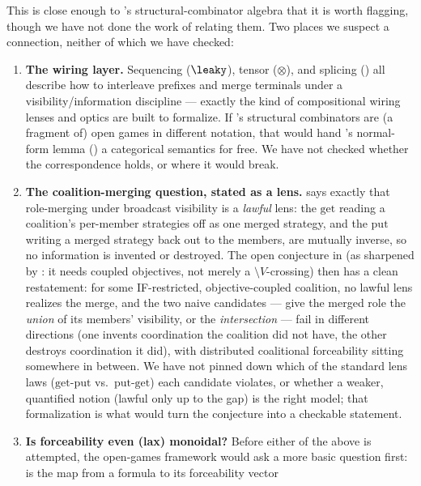 This is close enough to 's structural-combinator
algebra that it is worth flagging, though we have not done the work of
relating them. Two places we suspect a connection, neither of which we have
checked:
\begin{enumerate}[nosep]
  \item \textbf{The wiring layer.} Sequencing ($\leaky$), tensor ($\otimes$),
  and splicing () all describe how to interleave prefixes
  and merge terminals under a visibility/information discipline --- exactly
  the kind of compositional wiring lenses and optics are built to formalize.
  If \KFOL's structural combinators are (a fragment of) open games in
  different notation, that would hand 's
  normal-form lemma () a categorical
  semantics for free. We have not checked whether the correspondence holds,
  or where it would break.
  \item \textbf{The coalition-merging question, stated as a lens.}
   says exactly that role-merging under
  broadcast visibility is a \emph{lawful} lens: the $\mathrm{get}$ reading a
  coalition's per-member strategies off as one merged strategy, and the
  $\mathrm{put}$ writing a merged strategy back out to the members, are
  mutually inverse, so no information is invented or destroyed. The open
  conjecture in  (as sharpened by
  : it needs coupled objectives, not
  merely a $\setminus V$-crossing) then has a clean restatement: for some
  IF-restricted, objective-coupled coalition, no lawful lens realizes the
  merge, and the two naive candidates --- give the merged role the
  \emph{union} of its members' visibility, or the \emph{intersection} ---
  fail in different directions (one invents coordination the coalition did
  not have, the other destroys coordination it did), with distributed
  coalitional forceability sitting somewhere in between. We have not pinned
  down which of the standard lens laws ($\mathrm{get}$-$\mathrm{put}$ vs.\
  $\mathrm{put}$-$\mathrm{get}$) each candidate violates, or whether a
  weaker, quantified notion (lawful only up to the gap) is the right model;
  that formalization is what would turn the conjecture into a checkable
  statement.
  \item \textbf{Is forceability even (lax) monoidal?} Before either of the
  above is attempted, the open-games framework would ask a more basic
  question first: is the map from a formula to its forceability vector

\end{enumerate}
